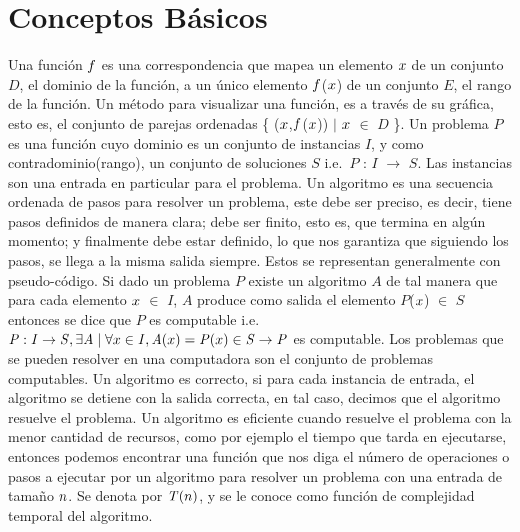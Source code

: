 \documentclass[12pt,twoside]{article}
\begin{document}
\section{Conceptos B\'asicos}

Una funci\'on $\mathnormal{f}$ es una correspondencia que mapea un elemento $\mathnormal{x}$ de un conjunto $\mathit{D}$, el dominio de la funci\'on, a un \'unico elemento $\mathnormal{f}$($\mathnormal{x}$) de un conjunto $\mathit{E}$, el rango de la funci\'on. Un m\'etodo para visualizar una funci\'on, es a trav\'es de su gr\'afica, esto es, el conjunto de parejas ordenadas \{ ($\mathnormal{x}$,$\mathnormal{f}$($\mathnormal{x}$)) $\mid$ $\mathnormal{x}$ $\in$ $\mathit{D}$ \}.
\newline
\newline
Un problema $\mathit{P}$ es una funci\'on cuyo dominio es un conjunto de instancias $\mathit{I}$, y como contradominio(rango), un conjunto de soluciones $\mathit{S}$ i.e.\ $\mathit{P}$ : $\mathit{I}$ $\to$ $\mathit{S}$. Las instancias son una entrada en particular para el problema. 
\newline
\newline
Un algoritmo es una secuencia ordenada de pasos para resolver un problema, este debe ser preciso, es decir, tiene pasos definidos de manera clara; debe ser finito, esto es, que termina en alg\'un momento; y finalmente debe estar definido, lo que nos garantiza que siguiendo los pasos, se llega a la misma salida siempre. Estos se representan generalmente con pseudo-c\'odigo.
\newline
Si dado un problema $\mathit{P}$ existe un algoritmo $\mathit{A}$ de tal manera que para cada elemento $\mathnormal{x}$ $\in$ $\mathit{I}$, $\mathit{A}$ produce como salida el elemento $\mathit{P}$($\mathnormal{x}$) $\in$ $\mathit{S}$ entonces se dice que $\mathit{P}$ es computable i.e.\
$\mathit{P} : \mathit{I} \to \mathit{S}, \exists \mathit{A} \mid \forall \mathnormal{x} \in \mathit{I}, \mathit{A}(\mathnormal{x}) = \mathit{P}(\mathnormal{x}) \in \mathit{S} \to \mathit{P}$ es computable. Los problemas que se pueden resolver en una computadora son el conjunto de problemas computables.
\newline
\newline
Un algoritmo es correcto, si para cada instancia de entrada, el algoritmo se detiene con la salida correcta, en tal caso, decimos que el algoritmo resuelve el problema. Un algoritmo es eficiente cuando resuelve el problema con la menor cantidad de recursos, como por ejemplo el tiempo que tarda en ejecutarse, entonces podemos encontrar una funci\'on que nos diga el n\'umero de operaciones o pasos a ejecutar por un algoritmo para resolver un problema con una entrada de tamaño $\mathnormal{n}$. Se denota por $\mathit{T}(\mathnormal{n})$, y se le conoce como funci\'on de complejidad temporal del algoritmo.
\end{document}
